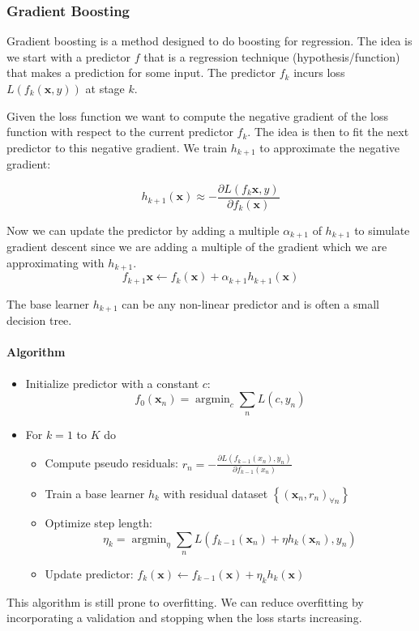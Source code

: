 \documentclass[12pt]{article}
\begin{document}
        \subsubsection{Gradient Boosting}
            Gradient boosting is a method designed to do boosting for regression. The idea is we start with a predictor
            $f$ that is a regression technique (hypothesis/function) that makes a prediction for some input. The
            predictor $f_k$ incurs loss $L(f_k(\boldsymbol{x}, y))$ at stage $k$.

            Given the loss function we want to compute the negative gradient of the loss function with respect to the
            current predictor $f_k$. The idea is then to fit the next predictor to this negative gradient. We train
            $h_{k+1}$ to approximate the negative gradient:

            $$h_{k+1}(\boldsymbol{x}) \approx -\frac{\partial L(f_k{\boldsymbol{x}}, y)}{\partial f_k(\boldsymbol{x})}$$ 

            Now we can update the predictor by adding a multiple $\alpha_{k+1}$ of $h_{k+1}$ to simulate gradient
            descent since we are adding a multiple of the gradient which we are approximating with $h_{k+1}$.
            $$ f_{k+1}{\boldsymbol{x}} \leftarrow f_k(\boldsymbol{x}) + \alpha_{k+1}h_{k+1}(\boldsymbol{x}) $$

            The base learner $h_{k+1}$ can be any non-linear predictor and is often a small decision tree.

            \paragraph{Algorithm}
                \begin{itemize}
                    \item Initialize predictor with a constant $c:$
                    $$f_{0}\left(\boldsymbol{x}_{n}\right)=\operatorname{argmin}_{c} \sum_{n} L\left(c, y_{n}\right)$$
                    \item For $k=1$ to $K$ do
                    \begin{itemize}
                        \item Compute pseudo residuals: $r_{n}=-\frac{\partial L\left(f_{k-1}\left(x_{n}\right), y_{n}\right)}{\partial f_{k-1}\left(x_{n}\right)}$
                        \item Train a base learner $h_{k}$ with residual dataset $\left\{\left(\boldsymbol{x}_{n}, r_{n}\right)_{\forall n}\right\}$
                        \item Optimize step length:
                        $$
                        \eta_{k}=\operatorname{argmin}_{\eta} \sum_{n} L\left(f_{k-1}\left(\boldsymbol{x}_{n}\right)+\eta h_{k}\left(\boldsymbol{x}_{n}\right), y_{n}\right)
                        $$
                        \item Update predictor: $f_{k}(\boldsymbol{x}) \leftarrow f_{k-1}(\boldsymbol{x})+\eta_{k} h_{k}(\boldsymbol{x})$
                    \end{itemize}
                \end{itemize}

                This algorithm is still prone to overfitting. We can reduce overfitting by incorporating a validation
                and stopping when the loss starts increasing. 
\printindex
\end{document}
